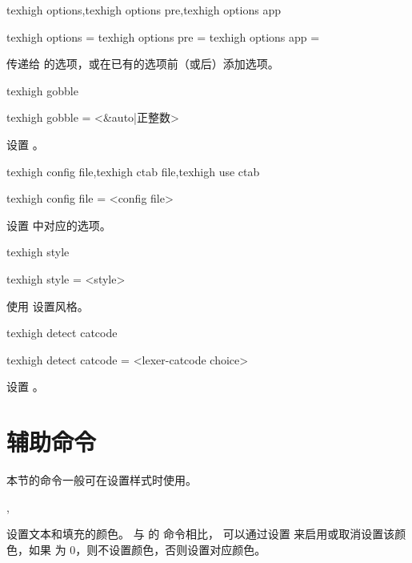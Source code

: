 \documentclass[class=article,openany]{cusdoc}[2025/10/10]
\begin{document}
\begin{keyval}[module=tcolorbox, path=/tcb]{texhigh options,texhigh options pre,texhigh options app}
  \begin{syntax}
    texhigh options     = 
    texhigh options pre = 
    texhigh options app = 
  \end{syntax}
传递给  的选项，或在已有的选项前（或后）添加选项。
\end{keyval}

\begin{keyval}[module=tcolorbox, path=/tcb]{texhigh gobble}
  \begin{syntax}
    texhigh gobble = <&auto|正整数>
  \end{syntax}
设置 。
\end{keyval}

\begin{keyval}[module=tcolorbox, path=/tcb]{
  texhigh config file,texhigh ctab file,texhigh use ctab
}
  \begin{syntax}
    texhigh config file = <{config file}>
  \end{syntax}
设置  中对应的选项。
\end{keyval}

\begin{keyval}[module=tcolorbox, path=/tcb]{texhigh style}
  \begin{syntax}
    texhigh style = <{style}>
  \end{syntax}
使用  设置风格。
\end{keyval}

\begin{keyval}[module=tcolorbox, path=/tcb]{texhigh detect catcode}
  \begin{syntax}
    texhigh detect catcode = <{lexer-catcode choice}>
  \end{syntax}
设置 。
\end{keyval}


\section{辅助命令}

本节的命令一般可在设置样式时使用。

\begin{function}{\THcolor,\THColorStatus}
  \begin{syntax}
    \V\THcolor {}
    \V\THcolor {} 
    \V\THColorStatus {}
  \end{syntax}
设置文本和填充的颜色。
与 \autocite{xcolor} 的  命令相比， 可以通过设置  来启用或取消设置该颜色，如果  为 0，则不设置颜色，否则设置对应颜色。
\end{function}
\end{document}
